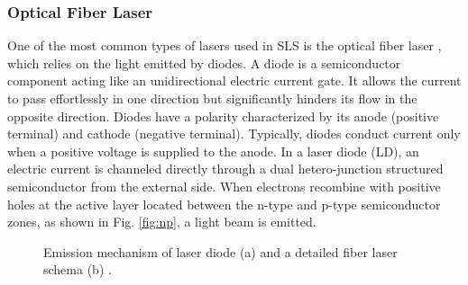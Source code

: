 \subsubsection{Optical Fiber Laser}
\label{sssec:fiberlaser}
One of the most common types of lasers used in SLS is the optical fiber laser \cite{milewski_additive_2017}, which relies on the light emitted by diodes. A diode is a semiconductor component acting like an unidirectional electric current gate. It allows the current to pass effortlessly in one direction but significantly hinders its flow in the opposite direction. Diodes have a polarity characterized by its anode (positive terminal) and cathode (negative terminal). Typically, diodes conduct current only when a positive voltage is supplied to the anode. In a laser diode (LD), an electric current is channeled directly through a dual hetero-junction structured semiconductor from the external side. When electrons recombine with positive holes at the active layer located between the n-type and p-type semiconductor zones, as shown in Fig. \ref{fig:np}, a light beam is emitted.
\begin{figure}
    \centering
    \qquad
    \caption[Laser diode and fiber laser.]{Emission mechanism of laser diode (a) and a detailed fiber laser schema (b) \cite{katayama_fundamentals_2020}.}
\end{figure}
